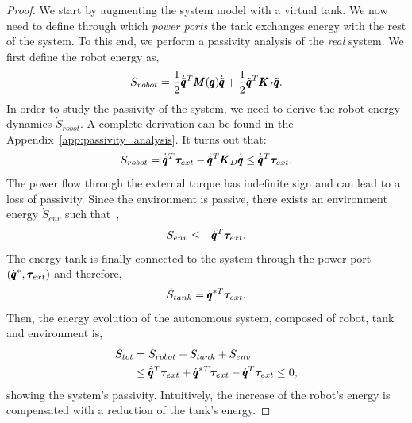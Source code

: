 \begin{proof}
We start by augmenting the system model with a virtual tank. We now need to define through which \emph{power ports} the tank exchanges energy with the rest of the system. To this end, we perform a passivity analysis of the \emph{real} system. We first define the robot energy as, 
\begin{equation}
    S_{robot} = \frac{1}{2} \dot{\tilde{\pmb{q}}}^T \pmb{M}(\pmb{q}) \dot{\tilde{\pmb{q}}} + \frac{1}{2} \tilde{\pmb{q}}^T \pmb{K}_I \tilde{\pmb{q}}.
\end{equation}
In order to study the passivity of the system, we need to derive the robot energy dynamics $\dot{S}_{robot}$. A complete derivation can be found in the Appendix~\ref{app:passivity_analysis}. It turns out that:
\begin{equation}
    \dot{S}_{robot} = \dot{\tilde{\pmb{q}}}^T \boldsymbol{\tau}_{ext} - \dot{\tilde{\pmb{q}}}^T \pmb{K}_D \dot{\tilde{\pmb{q}}} \leq \dot{\tilde{\pmb{q}}}^T \boldsymbol{\tau}_{ext}. 
\end{equation}
The power flow through the external torque has indefinite sign and can lead to a loss of passivity. Since the environment is passive, there exists an environment energy $\dot{S}_{env}$ such that~\cite{shahriari2018valve},
\begin{equation}
    \dot{S}_{env} \leq -\dot{\pmb{q}}^T \boldsymbol{\tau}_{ext}.
\end{equation}
The energy tank is finally connected to the system through the power port $(\dot{\pmb{q}}^*, \boldsymbol{\tau}_{ext})$ and therefore,
\begin{equation} \label{eq:tank_dynamics}
\dot{S}_{tank} = \dot{\pmb{q}}^{*T} \boldsymbol{\tau}_{ext}. 
\end{equation}
Then, the energy evolution of the autonomous system, composed of robot, tank and environment is,
\begin{equation} 
\begin{aligned} \label{eq:autonomous_sys_energy}
    \dot{S}_{tot} &= \dot{S}_{robot} + \dot{S}_{tank} + \dot{S}_{env} \\
    &\leq \dot{\tilde{\pmb{q}}}^T \boldsymbol{\tau}_{ext} + \dot{\pmb{q}}^{*T} \boldsymbol{\tau}_{ext} - \dot{\pmb{q}}^T \boldsymbol{\tau}_{ext} \leq 0,
\end{aligned}
\end{equation}
showing the system's passivity.
Intuitively, the increase of the robot's energy is compensated with a reduction of the tank's energy. 
\end{proof}
